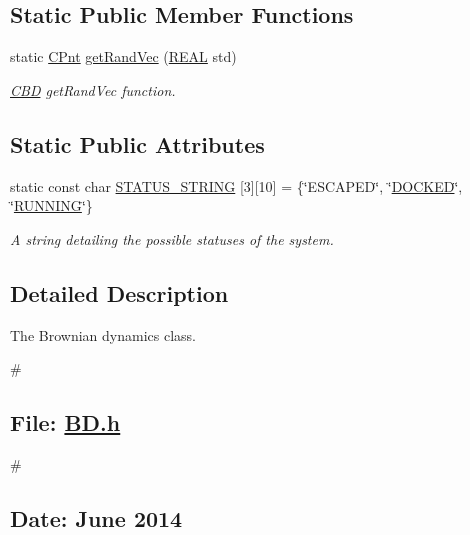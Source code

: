 \subsection*{Static Public Member Functions}
\begin{DoxyCompactItemize}
\item 
static \hyperlink{classCPnt}{C\-Pnt} \hyperlink{classCBD_a9ad6f87e7436fa716a470e97f0ec836f}{get\-Rand\-Vec} (\hyperlink{util_8h_a5821460e95a0800cf9f24c38915cbbde}{R\-E\-A\-L} std)
\begin{DoxyCompactList}\small\item\em \hyperlink{classCBD}{C\-B\-D} get\-Rand\-Vec function. \end{DoxyCompactList}\end{DoxyCompactItemize}
\subsection*{Static Public Attributes}
\begin{DoxyCompactItemize}
\item 
static const char \hyperlink{classCBD_a20beab0b7b100a3d5baf2b3924453641}{S\-T\-A\-T\-U\-S\-\_\-\-S\-T\-R\-I\-N\-G} \mbox{[}3\mbox{]}\mbox{[}10\mbox{]} = \{\char`\"{}E\-S\-C\-A\-P\-E\-D\char`\"{}, \char`\"{}\hyperlink{classCBD_ad133262cc326c96e755511655e632e57ac0a9f8a84559135662cf71c4893a99ef}{D\-O\-C\-K\-E\-D}\char`\"{}, \char`\"{}\hyperlink{classCBD_ad133262cc326c96e755511655e632e57a4ba124eb7b8e8a8c32491bc599f62851}{R\-U\-N\-N\-I\-N\-G}\char`\"{}\}
\begin{DoxyCompactList}\small\item\em A string detailing the possible statuses of the system. \end{DoxyCompactList}\end{DoxyCompactItemize}


\subsection{Detailed Description}
The Brownian dynamics class. 

\# \subsection*{File\-: \hyperlink{BD_8h}{B\-D.\-h}}

\# \subsection*{Date\-: June 2014}

